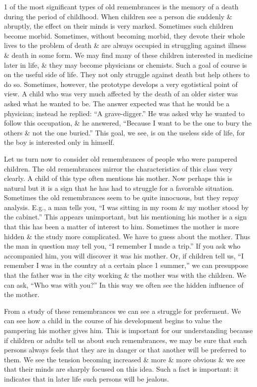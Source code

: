 \documentclass{article}
\numberwithin{equation}{section}
\begin{document}
1 of the most significant types of old remembrances is the memory of a death during the period of childhood. When children see a person die suddenly \& abruptly, the effect on their minds is very marked. Sometimes such children become morbid. Sometimes, without becoming morbid, they devote their whole lives to the problem of death \& are always occupied in struggling against illness \& death in some form. We may find many of these children interested in medicine later in life, \& they may become physicians or chemists. Such a goal of course is on the useful side of life. They not only struggle against death but help others to do so. Sometimes, however, the prototype develops a very egotistical point of view. A child who was very much affected by the death of an older sister was asked what he wanted to be. The answer expected was that he would be a physician; instead he replied: ``A grave-digger.'' He was asked why he wanted to follow this occupation, \& he answered, ``Because I want to be the one to bury the others \& not the one buried.'' This goal, we see, is on the useless side of life, for the boy is interested only in himself.

Let us turn now to consider old remembrances of people who were pampered children. The old remembrances mirror the characteristics of this class very clearly. A child of this type often mentions his mother. Now perhaps this is natural but it is a sign that he has had to struggle for a favorable situation. Sometimes the old remembrances seem to be quite innocuous, but they repay analysis. E.g., a man tells you, ``I was sitting in my room \& my mother stood by the cabinet.'' This appears unimportant, but his mentioning his mother is a sign that this has been a matter of interest to him. Sometimes the mother is more hidden \& the study more complicated. We have to guess about the mother. Thus the man in question may tell you, ``I remember I made a trip.'' If you ask who accompanied him, you will discover it was his mother. Or, if children tell us, ``I remember I was in the country at a certain place 1 summer,'' we can presuppose that the father was in the city working \& the mother was with the children. We can ask, ``Who was with you?'' In this way we often see the hidden influence of the mother.

From a study of these remembrances we can see a struggle for preferment. We can see how a child in the course of his development begins to value the pampering his mother gives him. This is important for our understanding because if children or adults tell us about such remembrances, we may be sure that such persons always feels that they are in danger or that another will be preferred to them. We see the tension becoming increased \& more \& more obvious \& we see that their minds are sharply focused on this idea. Such a fact is important: it indicates that in later life such persons will be jealous.
\end{document}
